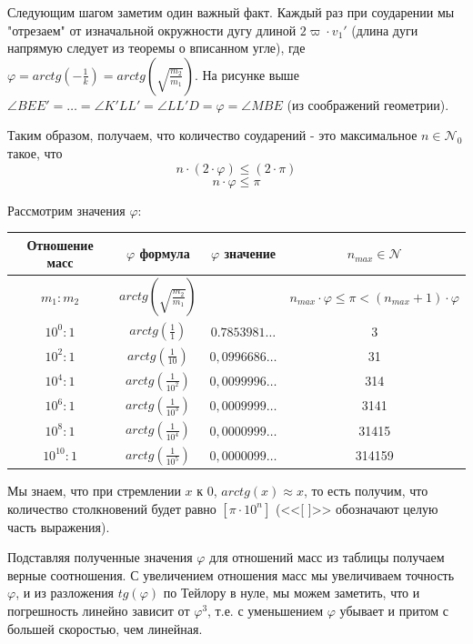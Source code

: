 \documentclass[a4paper,12pt]{article} %
\begin{document}
\newpage

Следующим шагом заметим один важный факт. Каждый раз при соударении мы "отрезаем" от изначальной окружности дугу длиной $2 \varpi \cdot v_1'$ (длина дуги напрямую следует из теоремы о вписанном угле), где $\varphi = arctg(-\frac{1}{k}) = arctg(\sqrt{\frac{m_2}{m_1}})$. На рисунке выше $\angle BEE' = \dots = \angle K'LL' = \angle LL'D = \varphi = \angle MBE$ (из соображений геометрии).

Таким образом, получаем, что количество соударений - это максимальное $n \in \mathcal{N}_0$ такое, что
\[n \cdot (2 \cdot \varphi) \leq (2 \cdot \pi)\]
\[ n \cdot \varphi \leq \pi\]

Рассмотрим значения $\varphi$:

\begin{center}
\begin{tabular}{|c|c|c|c|}
\hline
 Отношение масс & $\varphi$ формула & $\varphi$ значение & $n_{max} \in \mathcal{N}$\\ \hline
 $m_1 : m_2$ & $arctg(\sqrt{\frac{m_2}{m_1}})$ & & $n_{max} \cdot \varphi \leq \pi < (n_{max} + 1) \cdot \varphi$\\ \hline
 $10^0 : 1$ & $arctg(\frac{1}{1})$ & $0.7853981\dots$ & 3
 \\ \hline
 $10^2 : 1$ & $arctg(\frac{1}{10})$ & $0,0996686\dots$ & 31 \\ \hline
 $10^4 : 1$ &  $arctg(\frac{1}{10^2})$ & $0,0099996\dots$ & 314\\ \hline
 $10^6 : 1$ &  $arctg(\frac{1}{10^3})$ & $0,0009999\dots$ & 3141\\ \hline
 $10^8 : 1$ &  $arctg(\frac{1}{10^4})$ & $0,0000999\dots$ & 31415\\ \hline
 $10^{10} : 1$ &  $arctg(\frac{1}{10^5})$ & $0,0000099\dots$ & 314159\\ \hline
\end{tabular}
\end{center}

Мы знаем, что при стремлении $x$ к 0, $arctg(x) \approx x$, то есть получим, что количество столкновений будет равно $[\pi \cdot 10^n]$ (<<[ ]>> обозначают целую часть выражения).

Подставляя полученные значения $\varphi$ для отношений масс из таблицы получаем верные соотношения. С увеличением отношения масс мы увеличиваем точность $\varphi$, и из разложения $tg(\varphi)$ по Тейлору в нуле, мы можем заметить, что и погрешность линейно зависит от $\varphi^3$, т.е. с уменьшением $\varphi$ убывает и притом с большей скоростью, чем линейная.
\end{document}
